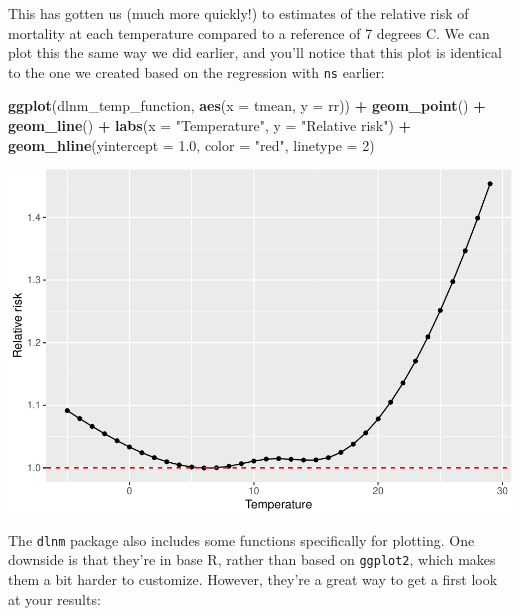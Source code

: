 \documentclass[
]{book}
\newenvironment{Shaded}{\begin{snugshade}}{\end{snugshade}}
\newcommand{\DataTypeTok}[1]{\textcolor[rgb]{0.13,0.29,0.53}{#1}}
\newcommand{\DecValTok}[1]{\textcolor[rgb]{0.00,0.00,0.81}{#1}}
\newcommand{\FloatTok}[1]{\textcolor[rgb]{0.00,0.00,0.81}{#1}}
\newcommand{\KeywordTok}[1]{\textcolor[rgb]{0.13,0.29,0.53}{\textbf{#1}}}
\newcommand{\NormalTok}[1]{#1}
\newcommand{\OperatorTok}[1]{\textcolor[rgb]{0.81,0.36,0.00}{\textbf{#1}}}
\newcommand{\StringTok}[1]{\textcolor[rgb]{0.31,0.60,0.02}{#1}}
\begin{document}
This has gotten us (much more quickly!) to estimates of the relative risk of mortality at
each temperature compared to a reference of 7 degrees C. We can plot this the same way we
did earlier, and you'll notice that this plot is identical to the one we created based on the
regression with \texttt{ns} earlier:

\begin{Shaded}
\begin{Highlighting}[]
\KeywordTok{ggplot}\NormalTok{(dlnm_temp_function, }\KeywordTok{aes}\NormalTok{(}\DataTypeTok{x =}\NormalTok{ tmean, }\DataTypeTok{y =}\NormalTok{ rr)) }\OperatorTok{+}\StringTok{ }
\StringTok{  }\KeywordTok{geom_point}\NormalTok{() }\OperatorTok{+}\StringTok{ }
\StringTok{  }\KeywordTok{geom_line}\NormalTok{() }\OperatorTok{+}\StringTok{ }
\StringTok{  }\KeywordTok{labs}\NormalTok{(}\DataTypeTok{x =} \StringTok{"Temperature"}\NormalTok{, }\DataTypeTok{y =} \StringTok{"Relative risk"}\NormalTok{) }\OperatorTok{+}\StringTok{ }
\StringTok{  }\KeywordTok{geom_hline}\NormalTok{(}\DataTypeTok{yintercept =} \FloatTok{1.0}\NormalTok{, }\DataTypeTok{color =} \StringTok{"red"}\NormalTok{, }\DataTypeTok{linetype =} \DecValTok{2}\NormalTok{)}
\end{Highlighting}
\end{Shaded}

\includegraphics{adv_epi_analysis_files/figure-latex/unnamed-chunk-82-1.pdf}

The \texttt{dlnm} package also includes some functions specifically for plotting. One downside
is that they're in base R, rather than based on \texttt{ggplot2}, which makes them a bit
harder to customize. However, they're a great way to get a first look at your results:
\end{document}
